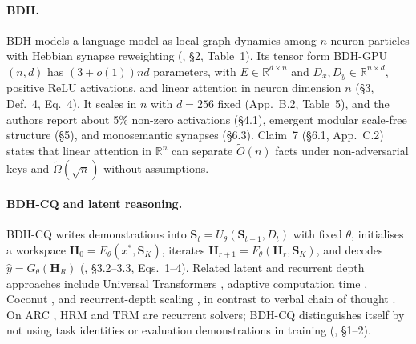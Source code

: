 \documentclass[11pt]{article}
\theoremstyle{remark}
\newcommand{\R}{\mathbb{R}}
\newcommand{\Sm}{\mathbf{S}}
\newcommand{\Hm}{\mathbf{H}}
\begin{document}
\paragraph{BDH.} BDH models a language model as local graph dynamics among $n$ neuron particles with Hebbian
synapse reweighting (\citealp{kosowski2025bdh}, \S2, Table~1). Its tensor form BDH-GPU$(n,d)$ has
$(3+o(1))nd$ parameters, with $E\in\R^{d\times n}$ and $D_x,D_y\in\R^{n\times d}$, positive ReLU activations, and
linear attention in neuron dimension $n$ (\S3, Def.~4, Eq.~4). It scales in $n$ with $d=256$ fixed
(App.~B.2, Table~5), and the authors report about 5\% non-zero activations (\S4.1), emergent modular scale-free
structure (\S5), and monosemantic synapses (\S6.3). Claim~7 (\S6.1, App.~C.2) states that linear attention in
$\R^n$ can separate $\tilde O(n)$ facts under non-adversarial keys and $\tilde\Omega(\sqrt n)$ without assumptions.

\paragraph{BDH-CQ and latent reasoning.} BDH-CQ writes demonstrations into $\Sm_t=U_\theta(\Sm_{t-1},D_t)$ with
fixed $\theta$, initialises a workspace $\Hm_0=E_\theta(x^*,\Sm_K)$, iterates $\Hm_{r+1}=F_\theta(\Hm_r,\Sm_K)$, and
decodes $\hat y=G_\theta(\Hm_R)$ (\citealp{engdahl2026bdhcq}, \S3.2--3.3, Eqs.~1--4). Related latent and recurrent
depth approaches include Universal Transformers \citep{dehghani2019universal}, adaptive computation time
\citep{graves2016act}, Coconut \citep{hao2024coconut}, and recurrent-depth scaling \citep{geiping2025recurrent},
in contrast to verbal chain of thought \citep{wei2022cot}. On ARC \citep{chollet2019measure}, HRM
\citep{wang2025hrm} and TRM \citep{jolicoeur2025trm} are recurrent solvers; BDH-CQ distinguishes itself by not using
task identities or evaluation demonstrations in training (\citealp{engdahl2026bdhcq}, \S1--2).
\end{document}
